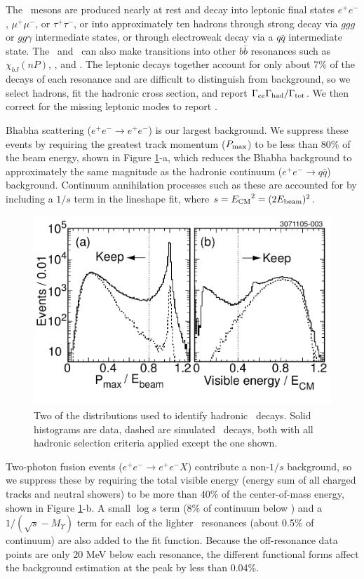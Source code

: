 \documentclass[aps,prl,superscriptaddress,showpacs,floatfix]{revtex4}
\begin{document}
The \ups\ mesons are produced nearly at rest and decay into leptonic
final states $e^+e^-$, $\mu^+\mu^-$, or $\tau^+\tau^-$, or into
approximately ten hadrons through strong decay via $ggg$ or $gg\gamma$
intermediate states, or through electroweak decay via a $q\bar{q}$
intermediate state.  The \uss\ and \usss\ can also make transitions
into other $b\bar{b}$ resonances such as $\chi_{bJ}(nP)$, \us, and
\uss.  The leptonic decays together account for only about 7\% of the
decays of each resonance and are difficult to distinguish from
background, so we select hadrons, fit the hadronic cross section, and
report $\Gamma_{ee}\Gamma_{\mbox{\scriptsize had}}/\Gamma_{\mbox{\scriptsize tot}}$.  We then correct for the missing leptonic modes
to report \gee.

Bhabha scattering ($e^+e^- \to e^+e^-$) is our largest background.  We
suppress these events by requiring the greatest track momentum
($P_{\mbox{\scriptsize max}}$) to be less than 80\% of the beam
energy, shown in Figure \ref{fig:cuts}-a, which reduces the Bhabha
background to approximately the same magnitude as the hadronic
continuum ($e^+e^- \to q\bar{q}$) background.  Continuum annihilation
processes such as these are accounted for by including a $1/s$ term in
the lineshape fit, where $s = {E_{\mbox{\scriptsize CM}}}^2 = (2
E_{\mbox{\scriptsize beam}})^2$.

\begin{figure}
  \includegraphics[width=0.5\linewidth]{cuts}
  \caption{\label{fig:cuts} Two of the distributions used to identify
hadronic \ups\ decays.  Solid histograms are data, dashed are
simulated \ups\ decays, both with all hadronic selection criteria
applied except the one shown.}
\end{figure}

Two-photon fusion events ($e^+e^- \to e^+e^- X$) contribute a
non-$1/s$ background, so we suppress these by requiring the total
visible energy (energy sum of all charged tracks and neutral showers)
to be more than 40\% of the center-of-mass energy, shown in Figure
\ref{fig:cuts}-b.  A small $\log s$ term (8\% of continuum below \us)
and a $1/(\sqrt{s}-M_\Upsilon)$ term for each of the lighter \ups\
resonances (about 0.5\% of continuum) are also added to the fit
function.  Because the off-resonance data points are only 20 MeV below
each resonance, the different functional forms affect the background
estimation at the peak by less than 0.04\%.
\end{document}
